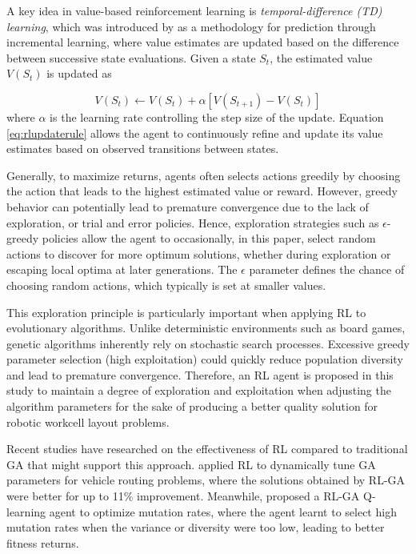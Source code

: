 \documentclass{article}
\begin{document}
A key idea in value-based reinforcement learning is \textit{temporal-difference (TD) learning}, which was introduced by \textcite{sutton1988td} as a methodology for prediction through incremental learning, where value estimates are updated based on the difference between successive state evaluations. Given a state $S_t$, the estimated value $V(S_t)$ is updated as

\begin{equation}
    V(S_t) \leftarrow V(S_t) + \alpha \left[ V(S_{t+1}) - V(S_t) \right]
    \label{eq:rlupdaterule}
\end{equation}
where $\alpha$ is the learning rate controlling the step size of the update. Equation \ref{eq:rlupdaterule} allows the agent to continuously refine and update its value estimates based on observed transitions between states.

Generally, to maximize returns, agents often selects actions greedily by choosing the action that leads to the highest estimated value or reward. However, greedy behavior can potentially lead to premature convergence due to the lack of exploration, or trial and error policies. Hence, exploration strategies such as $\epsilon$-greedy policies allow the agent to occasionally, in this paper, select random actions to discover for more optimum solutions, whether during exploration or escaping local optima at later generations. The $\epsilon$ parameter defines the chance of choosing random actions, which typically is set at smaller values.

This exploration principle is particularly important when applying RL to evolutionary algorithms. Unlike deterministic environments such as board games, genetic algorithms inherently rely on stochastic search processes. Excessive greedy parameter selection (high exploitation) could quickly reduce population diversity and lead to premature convergence. Therefore, an RL agent is proposed in this study to maintain a degree of exploration and exploitation when adjusting the algorithm parameters for the sake of producing a better quality solution for robotic workcell layout problems.

Recent studies have researched on the effectiveness of RL compared to traditional GA that might support this approach. \textcite{quevedo2021gecco} applied RL to dynamically tune GA parameters for vehicle routing problems, where the solutions obtained by RL-GA were better for up to 11\% improvement. Meanwhile, \textcite{Woodcock2024Genetic} proposed a RL-GA Q-learning agent to optimize mutation rates, where the agent learnt to select high mutation rates when the variance or diversity were too low, leading to better fitness returns.
\end{document}
